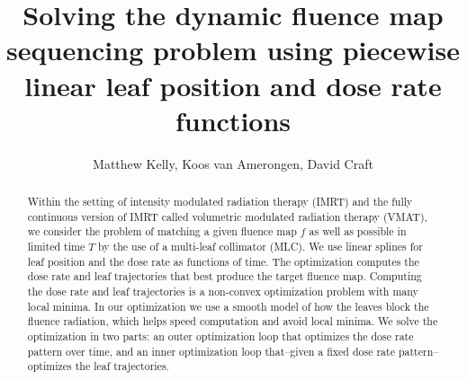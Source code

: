 \documentclass[12pt]{article}
\title{Solving the dynamic fluence map sequencing problem using piecewise linear leaf position and dose rate functions}
\author{Matthew Kelly, Koos van Amerongen, David Craft}
\affil[]{Department of Radiation Oncology, Massachusetts General Hospital, Harvard Medical School}
\begin{document}
\maketitle
\thispagestyle{empty}

\begin{abstract}
  Within the setting of intensity modulated radiation therapy (IMRT) and the fully continuous version of IMRT called
  volumetric modulated radiation therapy (VMAT), we consider the problem of matching a given fluence map $f$ as well as possible in
  limited time $T$ by the use of a multi-leaf collimator (MLC).
  We use linear splines for leaf position and the dose rate as functions of time.
  The optimization computes the dose rate and leaf trajectories that best produce
  the target fluence map.
  Computing the dose rate and leaf trajectories is a non-convex optimization problem
  with many local minima.
  In our optimization we use a smooth model of how the leaves block the fluence radiation,
  which helps speed computation and avoid local minima.
  We solve the optimization in two parts:
  an outer optimization loop that optimizes the dose rate pattern over time, and 
  an inner optimization loop that--given a fixed dose rate pattern--optimizes the leaf trajectories.
\end{abstract}
\end{document}
